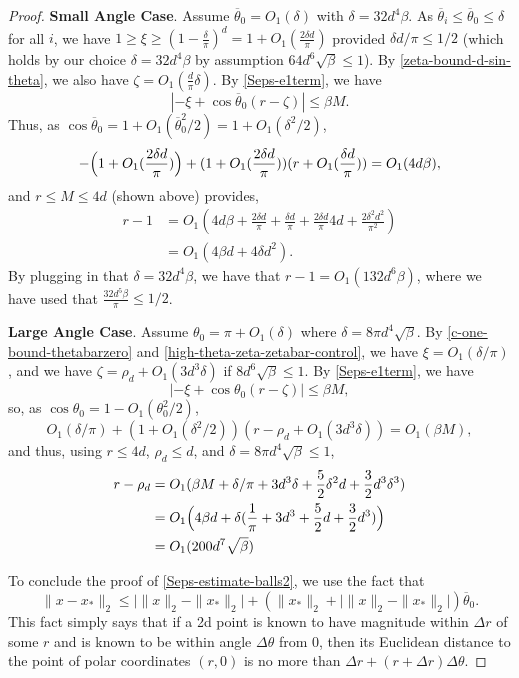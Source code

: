 \documentclass[11pt]{article}
\newcommand{\thetabar}{\overline{\theta}}
\newcommand{\zetacheck}{\rho}
\newcommand{\xo}{x_\ast}
\begin{document}
\begin{proof}
\textbf{Small Angle Case}.  Assume $\thetabar_0 = O_1(\delta)$ with $\delta = 32 d^4 \beta$.  As $\thetabar_i \leq \thetabar_0 \leq \delta$ for all $i$, we have $1 \geq \xi \geq (1 - \frac{\delta}{\pi})^d = 1 + O_1(\frac{2 \delta d}{\pi})$ provided $\delta d/\pi \leq 1/2$ (which holds by our choice $\delta = 32 d^4 \beta$ by assumption $64 d^6 \sqrt{\beta} \leq 1$).   By \eqref{zeta-bound-d-sin-theta}, we also have $\zeta = O_1( \frac{d}{\pi} \delta)$.  By \eqref{Seps-e1term},  we have
\[
|-\xi + \cos \thetabar_0 ( r - \zeta)| \leq \beta M.
\]
Thus, as $\cos \thetabar_0 = 1 + O_1(\thetabar_0^2/2) = 1 + O_1(\delta^2/2)$,
\[
-\Bigl( 1 + O_1(\frac{2 \delta d}{\pi}) \Bigr) + (1 + O_1(\frac{2 \delta d}{\pi}) )(r + O_1(\frac{\delta d}{\pi})) = O_1(4 d \beta),
\]
and $r \leq M\leq 4 d$ (shown above) provides,
\begin{align}
r-1 &= O_1(4d \beta + \frac{2 \delta d}{\pi} + \frac{\delta d}{\pi} + \frac{2 \delta d}{\pi}4d + \frac{2 \delta^2 d^2}{\pi^2} )\\
&= O_1(4 \beta d + 4 \delta d^2).
\end{align}
By plugging in that $\delta = 32 d^4 \beta$, we have that $r-1 = O_1(132 d^6 \beta)$, where we have used that $\frac{32 d^5 \beta}{\pi} \leq 1/2$.

\textbf{Large Angle Case}.  Assume $\theta_0 = \pi + O_1(\delta)$ where $\delta = 8 \pi d^4 \sqrt{\beta}$.  By \eqref{c-one-bound-thetabarzero} and \eqref{high-theta-zeta-zetabar-control}, we have $\xi = O_1(\delta/\pi)$, and we have $\zeta = \zetacheck_d + O_1(3 d^3 \delta)$ if $8 d^6 \sqrt{\beta} \leq 1$.
By \eqref{Seps-e1term}, we have
\[
|-\xi +  \cos \theta_0 (r - \zeta) | \leq \beta M,
\]
so, as $\cos \theta_0 = 1 - O_1(\theta_0^2/2)$,
\[
O_1(\delta/\pi) + (1 + O_1(\delta^2/2))(r - \zetacheck_d + O_1(3 d^3 \delta)) = O_1(\beta M),
\]
and thus, using $r \leq 4 d$, $\zetacheck_d \leq d$, and $\delta = 8 \pi d^4 \sqrt{\beta} \leq 1$,
\begin{align}
r - \zetacheck_d &= O_1(\beta M + \delta/\pi + 3 d^3 \delta + \frac{5}{2} \delta^2 d + \frac{3}{2} d^3 \delta^3) \\
&= O_1 \Bigl(4 \beta d + \delta ( \frac{1}{\pi} + 3 d^3 + \frac{5}{2} d + \frac{3}{2} d^3) \Bigr) \\
&= O_1(200 d^7 \sqrt{\beta})
\end{align}

To conclude the proof of \eqref{Seps-estimate-balls2}, we use the fact that
\[
\|x - \xo\|_2 \leq  \bigl| \|x\|_2 - \|\xo\|_2   \bigr| + ( \|\xo\|_2 +  \bigl| \|x\|_2 - \|\xo\|_2   \bigr| ) \thetabar_0.
\]
This fact simply says that if a 2d point is known to have magnitude within $\Delta r$ of some $r$ and is known to be within angle $\Delta \theta$ from $0$, then its Euclidean distance to the point of polar coordinates $(r,0)$ is no more than $\Delta r + (r +  \Delta r) \Delta \theta$.



\end{proof}
\end{document}
